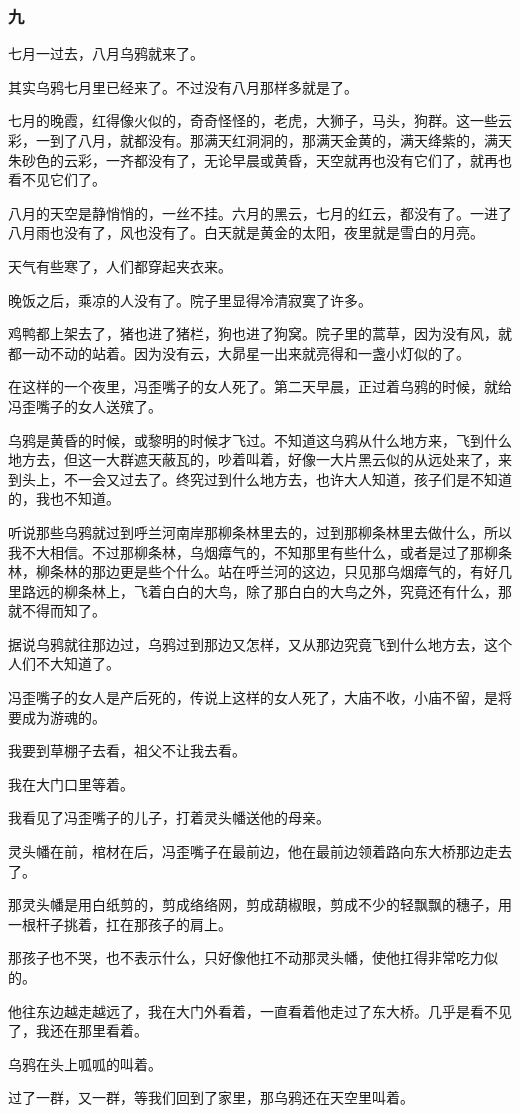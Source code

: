 \subsubsection*{九}
\par 七月一过去，八月乌鸦就来了。
\par 其实乌鸦七月里已经来了。不过没有八月那样多就是了。
\par 七月的晚霞，红得像火似的，奇奇怪怪的，老虎，大狮子，马头，狗群。这一些云彩，一到了八月，就都没有。那满天红洞洞的，那满天金黄的，满天绛紫的，满天朱砂色的云彩，一齐都没有了，无论早晨或黄昏，天空就再也没有它们了，就再也看不见它们了。
\par 八月的天空是静悄悄的，一丝不挂。六月的黑云，七月的红云，都没有了。一进了八月雨也没有了，风也没有了。白天就是黄金的太阳，夜里就是雪白的月亮。
\par 天气有些寒了，人们都穿起夹衣来。
\par 晚饭之后，乘凉的人没有了。院子里显得冷清寂寞了许多。
\par 鸡鸭都上架去了，猪也进了猪栏，狗也进了狗窝。院子里的蒿草，因为没有风，就都一动不动的站着。因为没有云，大昴星一出来就亮得和一盏小灯似的了。
\par 在这样的一个夜里，冯歪嘴子的女人死了。第二天早晨，正过着乌鸦的时候，就给冯歪嘴子的女人送殡了。
\par 乌鸦是黄昏的时候，或黎明的时候才飞过。不知道这乌鸦从什么地方来，飞到什么地方去，但这一大群遮天蔽瓦的，吵着叫着，好像一大片黑云似的从远处来了，来到头上，不一会又过去了。终究过到什么地方去，也许大人知道，孩子们是不知道的，我也不知道。
\par 听说那些乌鸦就过到呼兰河南岸那柳条林里去的，过到那柳条林里去做什么，所以我不大相信。不过那柳条林，乌烟瘴气的，不知那里有些什么，或者是过了那柳条林，柳条林的那边更是些个什么。站在呼兰河的这边，只见那乌烟瘴气的，有好几里路远的柳条林上，飞着白白的大鸟，除了那白白的大鸟之外，究竟还有什么，那就不得而知了。
\par 据说乌鸦就往那边过，乌鸦过到那边又怎样，又从那边究竟飞到什么地方去，这个人们不大知道了。
\par 冯歪嘴子的女人是产后死的，传说上这样的女人死了，大庙不收，小庙不留，是将要成为游魂的。
\par 我要到草棚子去看，祖父不让我去看。
\par 我在大门口里等着。
\par 我看见了冯歪嘴子的儿子，打着灵头幡送他的母亲。
\par 灵头幡在前，棺材在后，冯歪嘴子在最前边，他在最前边领着路向东大桥那边走去了。
\par 那灵头幡是用白纸剪的，剪成络络网，剪成葫椒眼，剪成不少的轻飘飘的穗子，用一根杆子挑着，扛在那孩子的肩上。
\par 那孩子也不哭，也不表示什么，只好像他扛不动那灵头幡，使他扛得非常吃力似的。
\par 他往东边越走越远了，我在大门外看着，一直看着他走过了东大桥。几乎是看不见了，我还在那里看着。
\par 乌鸦在头上呱呱的叫着。
\par 过了一群，又一群，等我们回到了家里，那乌鸦还在天空里叫着。

